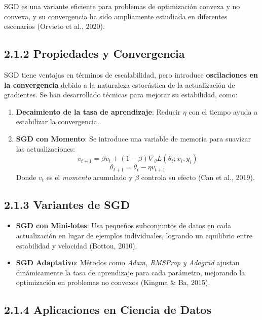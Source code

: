 \documentclass[a5paper]{article}
\begin{document}
	SGD es una variante eficiente para problemas de optimizaci\'on convexa y no convexa, y su convergencia ha sido ampliamente estudiada en diferentes escenarios (Orvieto et al., 2020).
	
	\subsection*{2.1.2 Propiedades y Convergencia}
	
	SGD tiene ventajas en t\'erminos de escalabilidad, pero introduce \textbf{oscilaciones en la convergencia} debido a la naturaleza estoc\'astica de la actualizaci\'on de gradientes. Se han desarrollado t\'ecnicas para mejorar su estabilidad, como:
	
	\begin{enumerate}
		\item \textbf{Decaimiento de la tasa de aprendizaje}: Reducir $\eta$ con el tiempo ayuda a estabilizar la convergencia.
		\item \textbf{SGD con Momento}: Se introduce una variable de memoria para suavizar las actualizaciones:
		\begin{equation}
			v_{t+1} = \beta v_t + (1 - \beta) \nabla_{\theta} L(\theta_t; x_i, y_i)
		\end{equation}
		\begin{equation}
			\theta_{t+1} = \theta_t - \eta v_{t+1}
		\end{equation}
		Donde $v_t$ es el \textit{momento} acumulado y $\beta$ controla su efecto (Can et al., 2019).
	\end{enumerate}
	
	\subsection*{2.1.3 Variantes de SGD}
	
	\begin{itemize}
		\item \textbf{SGD con Mini-lotes}: Usa peque\~nos subconjuntos de datos en cada actualizaci\'on en lugar de ejemplos individuales, logrando un equilibrio entre estabilidad y velocidad (Bottou, 2010).
		\item \textbf{SGD Adaptativo}: M\'etodos como \textit{Adam, RMSProp y Adagrad} ajustan din\'amicamente la tasa de aprendizaje para cada par\'ametro, mejorando la optimizaci\'on en problemas no convexos (Kingma \& Ba, 2015).
	\end{itemize}
	
	\subsection*{2.1.4 Aplicaciones en Ciencia de Datos}
	
\end{document}
